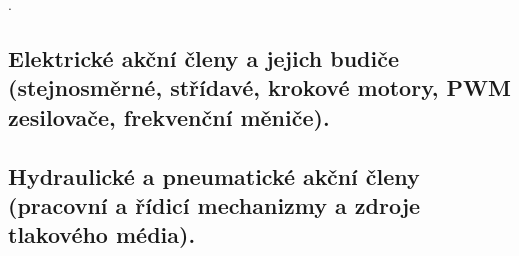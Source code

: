 \newpage . \newpage
\subsection{Elektrické akční členy a jejich budiče (stejnosměrné, střídavé, krokové motory, PWM zesilovače, frekvenční měniče).}

\newpage
\subsection{Hydraulické a pneumatické akční členy (pracovní a řídicí mechanizmy a zdroje tlakového média).}